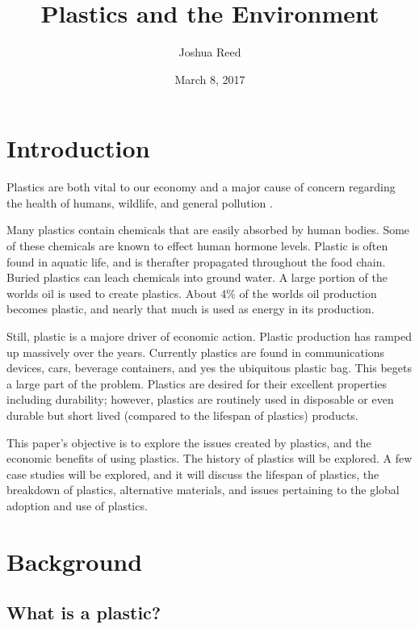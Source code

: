 \documentclass[paper=a4, fontsize=11pt]{article}
\title{Plastics and the Environment}
\author{Joshua Reed}
\date{March 8, 2017}
\begin{document}
\maketitle


\section{Introduction}

Plastics are both vital to our economy and a major cause of concern regarding the health of humans, wildlife, and general pollution \cite{pl_en}.

Many plastics contain chemicals that are easily absorbed by human bodies. Some of these chemicals are known to effect human hormone levels.
Plastic is often found in aquatic life, and is therafter propagated throughout the food chain. 
Buried plastics can leach chemicals into ground water. A large portion of the worlds oil is used to create plastics. About 4\% of the worlds oil 
production becomes plastic, and nearly that much is used as energy in its production.

Still, plastic is a majore driver of economic action. Plastic production has ramped up massively over the years. Currently plastics are found in 
communications devices, cars, beverage containers, and yes the ubiquitous plastic bag. This begets a large part of the problem. Plastics are desired
for their excellent properties including durability; however, plastics are routinely used in disposable or even durable but short lived (compared to the lifespan
of plastics) products.

This paper's objective is to explore the issues created by plastics, and the economic benefits of using plastics. The history of plastics will be explored. 
A few case studies will be explored, and it will discuss the lifespan of plastics, 
the breakdown of plastics, alternative materials, and issues pertaining to the global adoption and use of plastics.

\section{Background}

\subsection{What is a plastic?}
\end{document}
